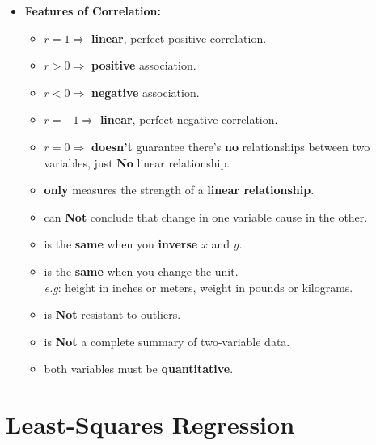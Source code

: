 \documentclass[Main.tex]{subfiles}
\begin{document}
\begin{example}
\begin{itemize}
			\item \textbf{Features of Correlation:}\\
				\begin{itemize}									 	
					\item $r=1\Longrightarrow$ \textbf{linear}, perfect positive correlation.\\
					\item $r>0\Longrightarrow$ \textbf{positive} association.\\
					\item $r<0\Longrightarrow$ \textbf{negative} association.\\
					\item $r=-1\Longrightarrow$ \textbf{linear}, perfect negative correlation.\\
					\item $r=0\Longrightarrow$ \textbf{doesn't} guarantee there's \textbf{no} relationships between two variables, just \textbf{No} linear relationship.\\
					\item \textbf{only} measures the strength of a \textbf{linear relationship}.\\
					\item can \textbf{Not} conclude that change in one variable cause in the other.\\
					\item is the \textbf{same} when you \textbf{inverse} $x$ and $y$.\\
					\item is the \textbf{same} when you change the unit.\\ \emph{e.g}: height in inches or meters, weight in pounds or kilograms.\\
					\item is \textbf{Not} resistant to outliers.\\
					\item is \textbf{Not} a complete summary of two-variable data.\\
					\item both variables must be \textbf{quantitative}.						 	
				\end{itemize}				
		\end{itemize}	
	\end{example} \hfill
						
	
	\section{Least-Squares Regression}
	
\end{document}
